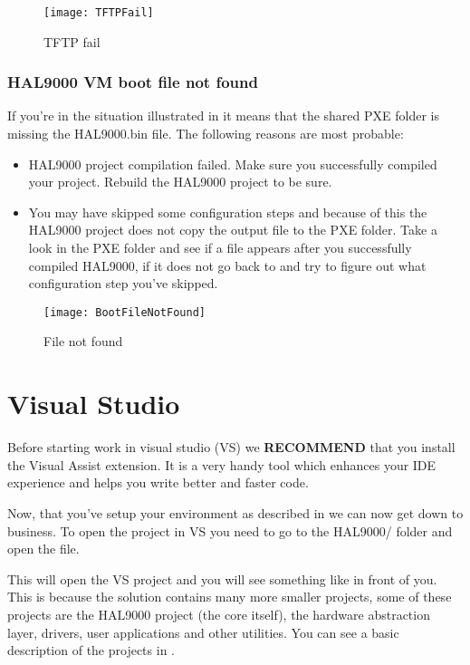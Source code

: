 \begin{appendices}
\begin{figure}
	\centering
	\texttt{[image: TFTPFail]}
		\caption{TFTP fail}
	\label{fig:TFTPFail}
\end{figure}

\subsubsection{HAL9000 VM boot file not found}

If you're in the situation illustrated in  it means that the shared
PXE folder is missing the HAL9000.bin file. The following reasons are most probable:
\begin{itemize}
	\item HAL9000 project compilation failed. Make sure you successfully compiled your project.
Rebuild the HAL9000 project to be sure.

	\item You may have skipped some configuration steps and because of this the HAL9000 project does
not copy the output file to the PXE folder. Take a look in the PXE folder and see if a file appears
after you successfully compiled HAL9000, if it does not go back to  and
try to figure out what configuration step you've skipped.
\end{itemize}

\begin{figure}
	\centering
	\texttt{[image: BootFileNotFound]}
		\caption{File not found}
	\label{fig:BootFileNotFound}
\end{figure}

\section{Visual Studio}
\label{sect:VisualStudio}

Before starting work in visual studio (VS) we \textbf{RECOMMEND} that you install the Visual Assist
\cite{visualAssist} extension. It is a very handy tool which enhances your IDE experience and helps
you write better and faster code.

Now, that you've setup your environment as described in  we can now get down
to business. To open the project in VS you need to go to the HAL9000/ folder and open the
 file.

This will open the \projectname VS project and you will see something like 
in front of you. This is because the solution contains many more smaller projects, some of these
projects are the HAL9000 project (the core itself), the hardware abstraction layer, drivers, user
applications and other utilities. You can see a basic description of the projects in
.


\end{appendices}
